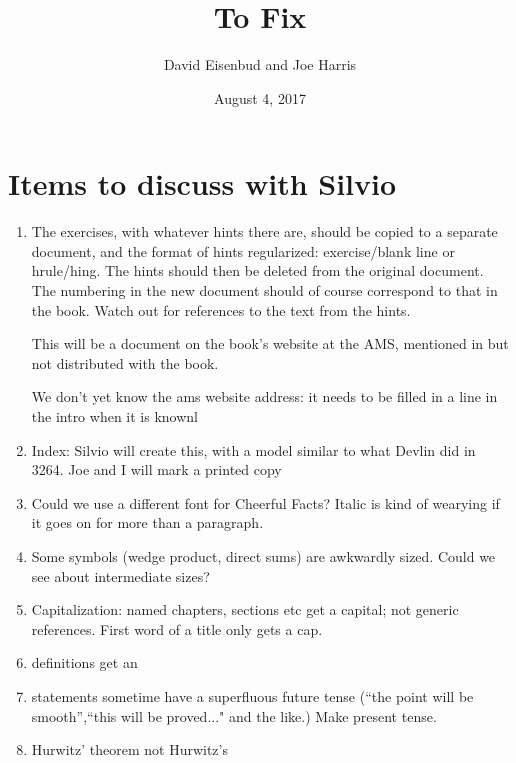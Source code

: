 \documentclass[12pt, leqno]{book}
\date{August 4, 2017}
\title{To Fix}
\author{David Eisenbud and Joe Harris }
\begin{document}
\maketitle

\setlength{\parskip}{5pt}

 
 \section{Items to discuss with Silvio}
 
 \begin{enumerate}
 
 \item The exercises, with whatever hints there are, should be copied to a separate document, and the format of hints regularized: 
 exercise/blank line or hrule/hing. The hints should then be deleted from the original document. The numbering in the new document should of course correspond to that in the book. Watch out for references to the text from the hints.
 
 This will be a document on the book's website at the AMS, 
 mentioned in but not distributed with the book.
 
 We don't yet know the ams website address: it needs to be filled in a line in the intro when it is knownl
   
 \item Index: Silvio will create this, with a model similar to what Devlin did in 3264. Joe and I will mark a printed copy
 
 \item Could we use a different font for Cheerful Facts? Italic is kind of wearying if it goes on for more than a paragraph.
 
 \item Some symbols (wedge product, direct sums) are awkwardly sized. Could we see about intermediate sizes?
 
 \item Capitalization: named chapters, sections etc get a capital; not generic references. First word of a title only gets a cap.
 
 \item definitions get an \emph{}
 
 \item statements sometime have a superfluous future tense (``the point will be smooth'',``this will be proved..." and the like.) Make present tense.
 
 \item Hurwitz' theorem not Hurwitz's 
 

\end{enumerate}
\end{document}
